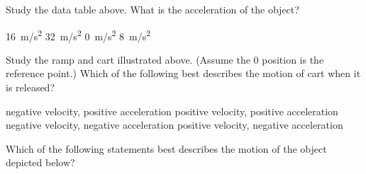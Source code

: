 \documentclass[answers]{exam}
\begin{document}
\begin{questions}
Study the data table above. What is the acceleration of the object?

\begin{randomizeoneparchoices}[norandomimze]
    \choice \SI{16}{m/s^2}   
    \choice \SI{32}{m/s^2}  
    \correctchoice \SI{0}{m/s^2}  
    \choice \SI{8}{m/s^2}  
\end{randomizeoneparchoices}

\question 
\phantom{.}

\begin{center}
\end{center}

Study the ramp and cart illustrated above. (Assume the 0 position is the reference point.) Which of the following best describes the motion of cart when it is released?

\begin{randomizechoices}
    \choice negative velocity, positive acceleration
    \correctchoice positive velocity, positive acceleration
    \choice negative velocity, negative acceleration
    \choice positive velocity, negative acceleration
\end{randomizechoices}



\question
Which of the following statements best describes the motion of the object depicted below?

\begin{center}
\end{center}


\end{questions}
\end{document}
